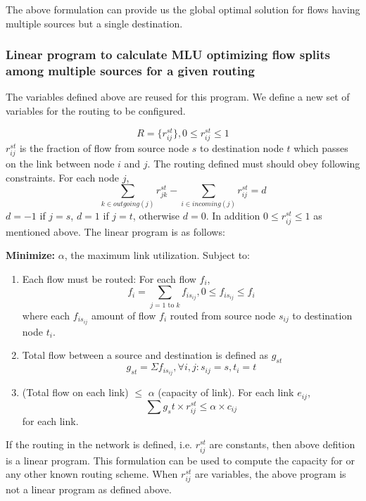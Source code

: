 The above formulation can provide us the global optimal solution for flows having multiple sources but a single destination.

\subsubsection{Linear program to calculate MLU optimizing flow splits among multiple sources for a given routing}

The variables defined above are reused for this program. We define a new set of variables for the routing to be configured.

\[R = \{r_{ij}^{st}\}, 0 \leq r_{ij}^{st} \leq 1\]
$r_{ij}^{st}$ is the fraction of flow from source node $s$ to destination node $t$ which passes on the link between node $i$ and $j$. 
The routing defined must should obey following constraints. For each node $j$,
\[ \sum_{k \in outgoing(j)} r_{jk}^{st} - \sum_{i \in incoming(j)} r_{ij}^{st} = d\]
$d = -1$ if $j = s$, $d = 1$ if $j = t$, otherwise $d = 0$. In addition $0 \leq r_{ij}^{st} \leq 1$ as mentioned above. The linear program is as follows:

\textbf{Minimize:}  $\alpha$, the maximum link utilization.
Subject to:
\begin{enumerate}
\item 
Each flow must be routed: For each flow $f_i$,
\[ f_i = \sum_{j = 1 \mbox{ to }k }  f_{is_{ij}}, 0 \leq  f_{is_{ij}} \leq f_i \]
where each $f_{is_{ij}}$ amount of flow $f_i$ routed from source node $s_{ij}$ to destination node $t_i$. 

\item 
Total flow between a source and destination is defined as $g_{st}$
\[ g_{st} = \Sigma f_{is_{ij}},   \forall i,j : s_{ij} = s , t_i = t \]

\item
(Total flow on each link) $\leq $ $\alpha $ (capacity of link). For each link $e_{ij}$, 
\[ \sum g_st \times r_{ij}^{st} \leq \alpha \times c_{ij} \]
for each link.

\end{enumerate}

If the routing in the network is defined, i.e. $r_{ij}^{st}$ are constants, then above defition is a linear program. This formulation can be used to compute the capacity for \invcap{} or any other known routing scheme. When $r_{ij}^{st}$ are variables, the above program is not a linear program as defined above.

